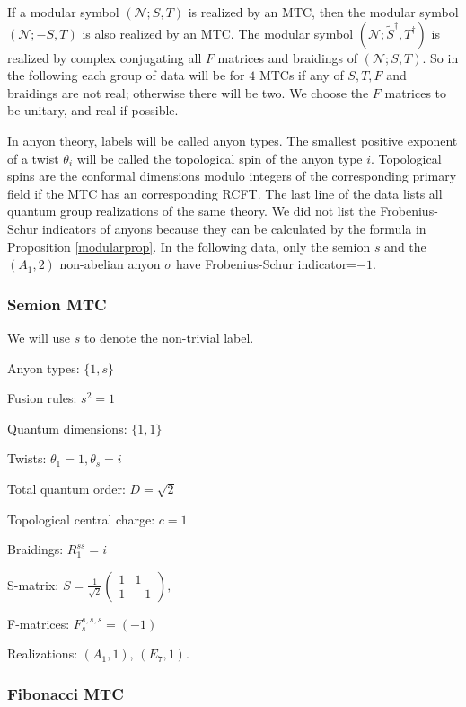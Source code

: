 \documentclass[12pt,psamsfonts]{amsart}
\newcommand{\mN}{\mathcal{N}}
\newcommand{\tS}{\tilde{S}}
\numberwithin{equation}{section}
\theoremstyle{definition}
\begin{document}
If a modular symbol $(\mN;S,T)$ is realized by an MTC, then the
modular symbol $(\mN;-S,T)$ is also realized by an MTC.  The
modular symbol $(\mN;\tS^\dag,T^\dag)$ is realized by complex
conjugating all $F$ matrices and braidings of $(\mN;S,T)$. So in
the following each group of data will be for $4$ MTCs if any of
$S,T,F$ and braidings are not real; otherwise there will be two.
We choose the $F$ matrices to be unitary, and real if possible.

In anyon theory, labels will be called anyon types.  The smallest
positive exponent of a twist $\theta_i$ will be called the
topological spin of the anyon type $i$.  Topological spins are the
conformal dimensions modulo integers of the corresponding primary
field if the MTC has an corresponding RCFT.  The last line of the
data lists all quantum group realizations of the same theory. We
did not list the Frobenius-Schur indicators of anyons because they
can be calculated by the formula in Proposition \ref{modularprop}.
In the following data, only the semion $s$ and the $(A_1,2)$
non-abelian anyon $\sigma$ have Frobenius-Schur indicator=$-1$.


\subsubsection{Semion MTC}

We will use $s$ to denote the non-trivial label.

Anyon types: $\{1,s\}$

Fusion rules: $s^2=1$

Quantum dimensions: $\{1,1\}$

Twists: $\theta_1=1, \theta_{s}=i$

Total quantum order: $D=\sqrt{2}$

Topological central charge: $c=1$

Braidings: $R_1^{ss}=i$

S-matrix: $ S=\frac{1}{\sqrt{2}} \begin{pmatrix} 1 & 1 \\
1 & -1
\end{pmatrix},$

F-matrices:  $ F^{s,s,s}_s=(-1)$

Realizations: $(A_1,1)$, $(E_7,1)$.

\subsubsection{Fibonacci MTC}
\end{document}
